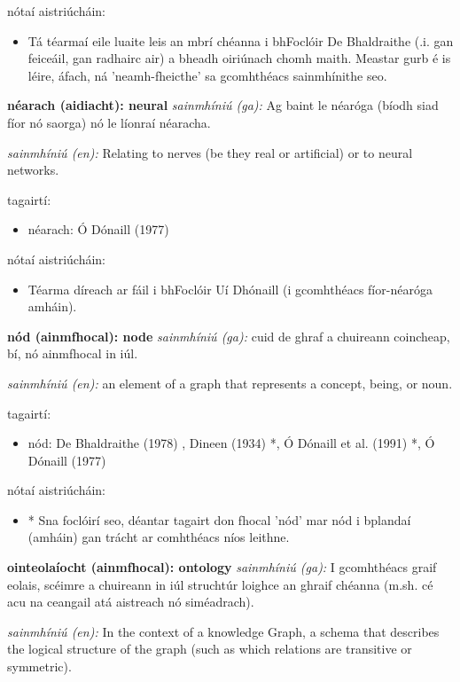 \documentclass{article}
\begin{document}
nótaí aistriúcháin:
\begin{itemize}
	\item Tá téarmaí eile luaite leis an mbrí chéanna i bhFoclóir De Bhaldraithe (.i. gan feiceáil, gan radhairc air) a bheadh oiriúnach chomh maith. Meastar gurb é is léire, áfach, ná 'neamh-fheicthe' sa gcomhthéacs sainmhínithe seo.
\end{itemize}


\textbf{néarach (aidiacht): neural}
\textit{sainmhíniú (ga):} Ag baint le néaróga (bíodh siad fíor nó saorga) nó le líonraí néaracha.

\textit{sainmhíniú (en):} Relating to nerves (be they real or artificial) or to neural networks.

tagairtí:
\begin{itemize}
	\item néarach: Ó Dónaill (1977) \cite{odonaill}
\end{itemize}

nótaí aistriúcháin:
\begin{itemize}
	\item Téarma díreach ar fáil i bhFoclóir Uí Dhónaill (i gcomhthéacs fíor-néaróga amháin).
\end{itemize}


\textbf{nód (ainmfhocal): node}
\textit{sainmhíniú (ga):} cuid de ghraf a chuireann coincheap, bí, nó ainmfhocal in iúl.

\textit{sainmhíniú (en):} an element of a graph that represents a concept, being, or noun.

tagairtí:
\begin{itemize}
	\item nód: De Bhaldraithe (1978) \cite{de-bhaldraithe}, Dineen (1934) \cite{dineen}*, Ó Dónaill et al. (1991) \cite{focloir-beag}*, Ó Dónaill (1977) \cite{odonaill}
\end{itemize}

nótaí aistriúcháin:
\begin{itemize}
	\item * Sna foclóirí seo, déantar tagairt don fhocal 'nód' mar nód i bplandaí (amháin) gan trácht ar comhthéacs níos leithne.
\end{itemize}


\textbf{ointeolaíocht (ainmfhocal): ontology}
\textit{sainmhíniú (ga):} I gcomhthéacs graif eolais, scéimre a chuireann in iúl struchtúr loighce an ghraif chéanna (m.sh. cé acu na ceangail atá aistreach nó siméadrach).

\textit{sainmhíniú (en):} In the context of a knowledge Graph, a schema that describes the logical structure of the graph (such as which relations are transitive or symmetric).
\end{document}
